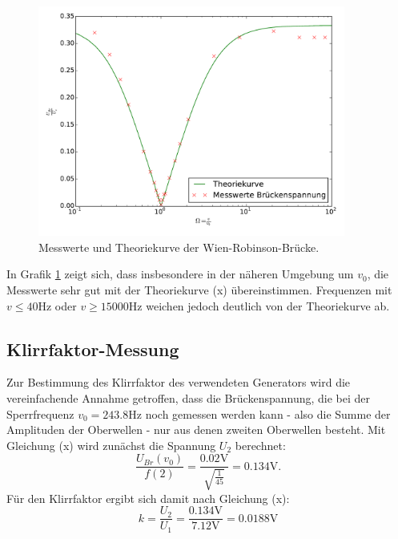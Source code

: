 \begin{figure}
  \centering
  \includegraphics[width=0.9\textwidth]{wien-robinson.pdf}
  \caption{Messwerte und Theoriekurve der Wien-Robinson-Brücke.}
  \label{fig:wien-robinson}
\end{figure}
In Grafik \ref{fig:wien-robinson} zeigt sich, dass insbesondere in der näheren
Umgebung um $v_0$, die Messwerte sehr gut mit der Theoriekurve (x) übereinstimmen.
Frequenzen mit $v \leq 40 \si{\hertz}$ oder $v \geq 15000 \si{\hertz}$ weichen
jedoch deutlich von der Theoriekurve ab.

\subsection{Klirrfaktor-Messung}
Zur Bestimmung des Klirrfaktor des verwendeten Generators wird die vereinfachende
Annahme getroffen, dass die Brückenspannung, die bei der Sperrfrequenz
$v_0=243.8 \si{\hertz}$ noch gemessen werden kann - also die Summe der Amplituden
der  Oberwellen - nur aus denen zweiten Oberwellen besteht.
Mit Gleichung (x) wird zunächst die Spannung $U_2$ berechnet:
\begin{equation*}
  \frac{U_{Br}(v_0)}{f(2)} = \frac{0.02\si{\volt}}{\sqrt{\frac{1}{45}}} = 0.134 \si{\volt}.
  \label{eqn:U2}
\end{equation*}
Für den Klirrfaktor ergibt sich damit nach Gleichung (x):
\begin{equation*}
  k = \frac{U_2}{U_1} = \frac{0.134 \si{\volt}}{7.12\si{\volt}} = 0.0188 \si{\volt}
  \label{eqn:klirrfaktor_berechnung}
\end{equation*}
